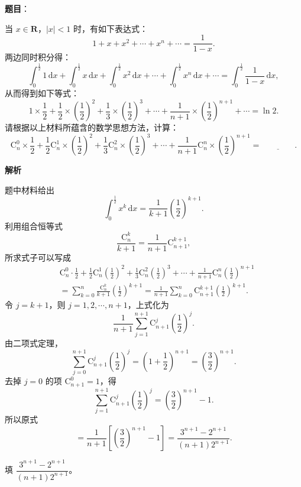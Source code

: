 \begin{answer}

\textbf{题目}：

当 $x\in\mathbf R$，$|x|<1$ 时，有如下表达式：
\nopagebreak[4]
\[1+x+x^2+\cdots+x^n+\cdots=\frac1{1-x}.\]
两边同时积分得：
\nopagebreak[4]
\[\int_0^{\frac12}1\,\mathrm dx+\int_0^{\frac12}x\,\mathrm dx+\int_0^{\frac12}x^2\,\mathrm dx+\cdots+\int_0^{\frac12}x^n\,\mathrm dx+\cdots=\int_0^{\frac12}\frac1{1-x}\,\mathrm dx,\]
从而得到如下等式：
\nopagebreak[4]
\[1\times\frac12+\frac12\times\left(\frac12\right)^2+\frac13\times\left(\frac12\right)^3+\cdots+\frac1{n+1}\times\left(\frac12\right)^{n+1}+\cdots=\ln2.\]
请根据以上材料所蕴含的数学思想方法，计算：
\nopagebreak[4]
\[\mathrm C_n^0\times\frac12+\frac12\mathrm C_n^1\times\left(\frac12\right)^2+\frac13\mathrm C_n^2\times\left(\frac12\right)^3+\cdots+\frac1{n+1}\mathrm C_n^n\times\left(\frac12\right)^{n+1}=\underline{\qquad\qquad}.\]

\textbf{解析}

题中材料给出
\nopagebreak[4]
\[\int_0^{\frac12}x^k\,\mathrm dx=\frac{1}{k+1}\left(\frac12\right)^{k+1}.\]
利用组合恒等式
\nopagebreak[4]
\[\frac{\mathrm C_n^k}{k+1}=\frac{1}{n+1}\mathrm C_{n+1}^{k+1},\]
所求式子可以写成
\nopagebreak[4]
\[\begin{aligned}
&\mathrm C_n^0\cdot\frac12+\frac12\mathrm C_n^1\left(\frac12\right)^2
+\frac13\mathrm C_n^2\left(\frac12\right)^3+\cdots
+\frac1{n+1}\mathrm C_n^n\left(\frac12\right)^{n+1}\\
&=\sum_{k=0}^{n}\frac{\mathrm C_n^k}{k+1}\left(\frac12\right)^{k+1}
=\frac1{n+1}\sum_{k=0}^{n}\mathrm C_{n+1}^{k+1}\left(\frac12\right)^{k+1}.
\end{aligned}\]
令 $j=k+1$，则 $j=1,2,\cdots,n+1$，上式化为
\nopagebreak[4]
\[\frac1{n+1}\sum_{j=1}^{n+1}\mathrm C_{n+1}^{j}\left(\frac12\right)^j.\]
由二项式定理，
\nopagebreak[4]
\[\sum_{j=0}^{n+1}\mathrm C_{n+1}^{j}\left(\frac12\right)^j
=\left(1+\frac12\right)^{n+1}=\left(\frac32\right)^{n+1}.\]
去掉 $j=0$ 的项 $\mathrm C_{n+1}^0=1$，得
\nopagebreak[4]
\[\sum_{j=1}^{n+1}\mathrm C_{n+1}^{j}\left(\frac12\right)^j
=\left(\frac32\right)^{n+1}-1.\]
所以原式
\nopagebreak[4]
\[=\frac1{n+1}\left[\left(\frac32\right)^{n+1}-1\right]
=\frac{3^{n+1}-2^{n+1}}{(n+1)2^{n+1}}.\]

填 $\dfrac{3^{n+1}-2^{n+1}}{(n+1)2^{n+1}}$。


\end{answer}
